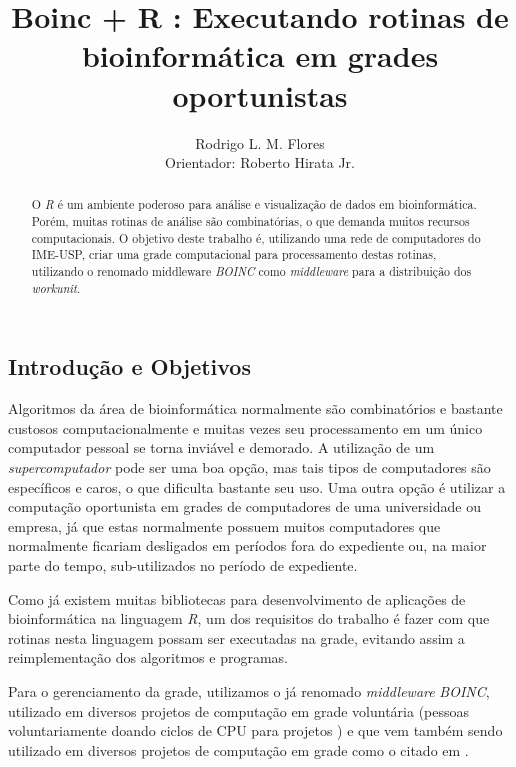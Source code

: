 \documentclass[b1]{sciposter}
\title{Boinc + R : Executando rotinas de bioinformática em grades oportunistas}
\author{Rodrigo L. M. Flores \\ Orientador: Roberto Hirata Jr. }
\institute{Instituto de Matemática e Estatística\\
           Universidade de São Paulo\\}
\begin{document}
\maketitle

\renewcommand{\papertype}{b1}

\begin{multicols}{2}

\begin{abstract}
O \textit{R} é um ambiente poderoso para análise e visualização de dados em bioinformática.  
Porém, muitas rotinas de análise são combinatórias, o que demanda muitos recursos computacionais. 
O objetivo deste trabalho é, utilizando uma rede de computadores do IME-USP, criar uma grade computacional para processamento 
destas rotinas, utilizando o renomado middleware \textit{BOINC} como \textit{middleware} para
a distribuição dos \textit{workunit}.

\end{abstract}

\section{Introdução e Objetivos}

Algoritmos da área de bioinformática normalmente são combinatórios e bastante custosos computacionalmente
e muitas vezes seu processamento em um único computador pessoal se torna inviável e demorado. A utilização de um 
\textit{supercomputador} pode ser uma boa opção, mas tais tipos de computadores são específicos e caros, o que 
dificulta bastante seu uso. Uma outra opção é utilizar a computação oportunista em grades de computadores de 
uma universidade ou empresa, já que estas normalmente possuem muitos computadores que normalmente ficariam desligados
 em períodos fora do expediente ou, na maior parte do tempo, sub-utilizados no período de expediente. 

Como já existem muitas bibliotecas para desenvolvimento de aplicações de bioinformática na linguagem \textit{R}, um dos
requisitos do trabalho é fazer com que rotinas nesta linguagem possam ser executadas na grade, evitando assim 
a reimplementação dos algoritmos e programas. 

Para o gerenciamento da grade, utilizamos o já renomado \textit{middleware} \emph{BOINC}, utilizado em diversos projetos
de computação em grade voluntária (pessoas voluntariamente doando ciclos de CPU para projetos ) e que vem também sendo utilizado
em diversos projetos de computação em grade como o citado em \cite{boinc}.


\end{multicols}
\end{document}
